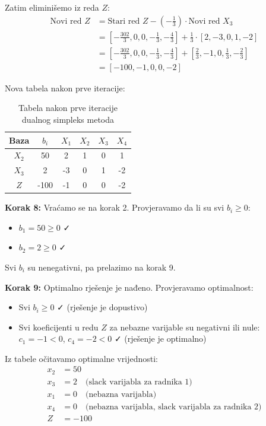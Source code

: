\documentclass[12pt,a4paper]{article}
\begin{document}
Zatim eliminišemo iz reda $Z$:
\begin{align}
\text{Novi red } Z &= \text{Stari red } Z - \left(-\frac{1}{3}\right) \cdot \text{Novi red } X_3 \\
&= \left[-\frac{302}{3}, 0, 0, -\frac{1}{3}, -\frac{4}{3}\right] + \frac{1}{3} \cdot [2, -3, 0, 1, -2] \\
&= \left[-\frac{302}{3}, 0, 0, -\frac{1}{3}, -\frac{4}{3}\right] + \left[\frac{2}{3}, -1, 0, \frac{1}{3}, -\frac{2}{3}\right] \\
&= \left[-100, -1, 0, 0, -2\right]
\end{align}

Nova tabela nakon prve iteracije:

\begin{table}[H]
\centering
\begin{tabular}{|c|c|c|c|c|c|}
\hline
Baza & $b_i$ & $X_1$ & $X_2$ & $X_3$ & $X_4$ \\
\hline
$X_2$ & 50 & 2 & 1 & 0 & 1 \\
\hline
$X_3$ & 2 & -3 & 0 & 1 & -2 \\
\hline
$Z$ & -100 & -1 & 0 & 0 & -2 \\
\hline
\end{tabular}
\caption{Tabela nakon prve iteracije dualnog simpleks metoda}
\end{table}

\textbf{Korak 8:} Vraćamo se na korak 2. Provjeravamo da li su svi $b_i \geq 0$:
\begin{itemize}
\item $b_1 = 50 \geq 0$ ✓
\item $b_2 = 2 \geq 0$ ✓
\end{itemize}

Svi $b_i$ su nenegativni, pa prelazimo na korak 9.

\textbf{Korak 9:} Optimalno rješenje je nađeno. Provjeravamo optimalnost:
\begin{itemize}
\item Svi $b_i \geq 0$ ✓ (rješenje je dopustivo)
\item Svi koeficijenti u redu $Z$ za nebazne varijable su negativni ili nule: $c_1 = -1 < 0$, $c_4 = -2 < 0$ ✓ (rješenje je optimalno)
\end{itemize}

Iz tabele očitavamo optimalne vrijednosti:
\begin{align}
x_2 &= 50 \\
x_3 &= 2 \quad \text{(slack varijabla za radnika 1)} \\
x_1 &= 0 \quad \text{(nebazna varijabla)} \\
x_4 &= 0 \quad \text{(nebazna varijabla, slack varijabla za radnika 2)} \\
Z &= -100
\end{align}
\end{document}
